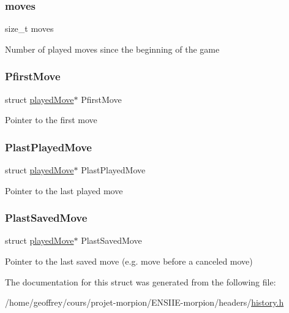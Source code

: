 \subsubsection{\texorpdfstring{moves}{moves}}
{\footnotesize\ttfamily size\+\_\+t moves}

Number of played moves since the beginning of the game \mbox{\label{structhistory_list_a6c241bff39776a3474b353f7c95e26b7}} 
\subsubsection{\texorpdfstring{Pfirst\+Move}{PfirstMove}}
{\footnotesize\ttfamily struct \hyperlink{structplayed_move}{played\+Move}$\ast$ Pfirst\+Move}

Pointer to the first move \mbox{\label{structhistory_list_add21c432af64a474240b0dcbeb21478a}} 
\subsubsection{\texorpdfstring{Plast\+Played\+Move}{PlastPlayedMove}}
{\footnotesize\ttfamily struct \hyperlink{structplayed_move}{played\+Move}$\ast$ Plast\+Played\+Move}

Pointer to the last played move \mbox{\label{structhistory_list_a06eb9e37622d16b0dfbc2360be31334b}} 
\subsubsection{\texorpdfstring{Plast\+Saved\+Move}{PlastSavedMove}}
{\footnotesize\ttfamily struct \hyperlink{structplayed_move}{played\+Move}$\ast$ Plast\+Saved\+Move}

Pointer to the last saved move (e.\+g. move before a canceled move) 

The documentation for this struct was generated from the following file\+:\begin{DoxyCompactItemize}
\item 
/home/geoffrey/cours/projet-\/morpion/\+E\+N\+S\+I\+I\+E-\/morpion/headers/\hyperlink{history_8h}{history.\+h}\end{DoxyCompactItemize}
